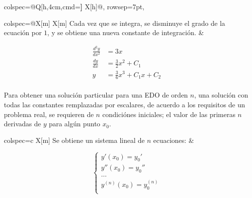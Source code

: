\documentclass[letterpaper]{article}
\begin{document}
\begin{longtblr}{
    colspec={@{}Q[h,4cm,cmd=\textbf] X[h]@{}},
    rowsep={7pt},
  }
\begin{minipage}{\linewidth}
    \begin{tblr}{colspec={@{}X[m] X[m]}}
      Cada vez que se integra, se disminuye el grado de la ecuación por $1$, y se obtiene una nueva constante de integración. 
    & \begin{minipage}{\linewidth}
      $$\begin{aligned}
        \frac{ d^2y }{ dx^2 } &= 3x \\
        \frac{dy}{dx} &= \frac{3}{2} x^2 + C_1 \\
        y &= \frac{3}{6} x^3 + C_1 x + C_2 \\
      \end{aligned}$$
    \end{minipage}
    \end{tblr}

    Para obtener una solución particular para una EDO de orden $n$, una solución con todas las constantes remplazadas por escalares, de acuerdo a los requisitos de un problema real, se requieren de $n$ condiciónes iniciales; el valor de las primeras $n$ derivadas de $y$ para algún punto $x_0$.

    \begin{tblr}{colspec={c X[m]}}
      Se obtiene un sistema lineal de $n$ ecuaciones:
      & \begin{minipage}{\linewidth}
        $$
          \begin{cases}
            y'(x_0)  = y_0' \\
            y''(x_0) = y_0'' \\
            \dots  \\
            y^{\left(n\right)}(x_0)  = y_0^{\left(n\right)} \\
          \end{cases}
        $$
      \end{minipage}
    \end{tblr}
  \end{minipage}

\end{longtblr}
\end{document}
